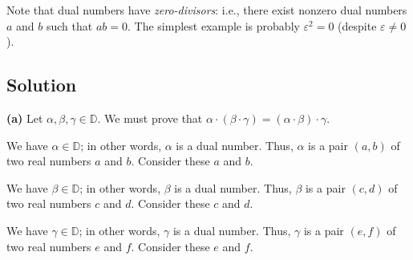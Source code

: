 \documentclass[paper=a4, fontsize=12pt]{scrartcl}%
\theoremstyle{plainsl}
\theoremstyle{definition}
\theoremstyle{remark}
\begin{document}
Note that dual numbers have \textit{zero-divisors}: i.e., there exist nonzero
dual numbers $a$ and $b$ such that $ab = 0$. The simplest example is probably
$\varepsilon^{2} = 0$ (despite $\varepsilon\neq0$).

\subsection{Solution}

\textbf{(a)} Let $\alpha,\beta,\gamma\in{\mathbb{D}}$. We must prove that
$\alpha\cdot\left(  \beta\cdot\gamma\right)  =\left(  \alpha\cdot\beta\right)
\cdot\gamma$.

We have $\alpha\in\mathbb{D}$; in other words, $\alpha$ is a dual number.
Thus, $\alpha$ is a pair $\left(  a,b\right)  $ of two real numbers $a$ and $b
$. Consider these $a$ and $b$.

We have $\beta\in\mathbb{D}$; in other words, $\beta$ is a dual number. Thus,
$\beta$ is a pair $\left(  c,d\right)  $ of two real numbers $c$ and $d$.
Consider these $c$ and $d$.

We have $\gamma\in\mathbb{D}$; in other words, $\gamma$ is a dual number.
Thus, $\gamma$ is a pair $\left(  e,f\right)  $ of two real numbers $e$ and $f
$. Consider these $e$ and $f$.
\end{document}
